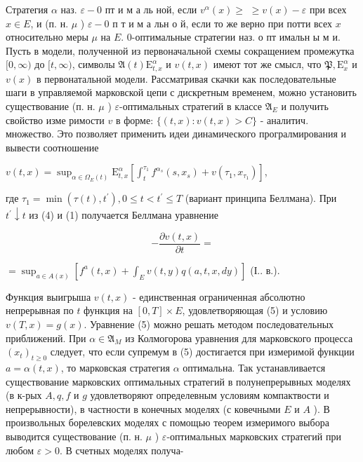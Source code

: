 \documentclass[10pt]{article}
\begin{document}
Стратегия $\alpha$ наз. $\varepsilon-0$ пт и м а ль ной, если $v^{\alpha}(x) \geqslant$ $\geqslant v(x)-\varepsilon$ при всех $x \in E$, и (п. н. $\mu$ ) $\varepsilon-0$ п т и м а льн о й, если то же верно при потти всех $x$ относительно меры $\mu$ на $E$. 0-оптимальные стратегии наз. о пт имальн ы м и. Пусть в модели, полученной из первоначальной схемы сокращением промежутка $[0, \infty)$ до $[t, \infty)$, символы $\mathfrak{A}(t) \mathrm{E}_{t, x}^{\alpha}$ и $v(t, x)$ имеют тот же смысл, что $\mathfrak{P}, \mathrm{E}_{x}^{\alpha}$ и $v(x)$ в первонатальной модели. Рассматривая скачки как последовательные шаги в управляемой марковской цепи с дискретным временем, можно установить существование (п. н. $\mu$ ) $\varepsilon$-оптимальных стратегий в классе $\mathfrak{A}_{E}$ и получить свойство изме римости $v$ в форме: $\{(t, x): v(t, x)>C\}$ - аналитич. множество. Это позволяет применить идеи динамического програлмирования и вывести соотношение



$v(t, x)=\sup _{\alpha \in \Omega_{E}(t)} \mathrm{E}_{t, x}^{\alpha}\left[\int_{t}^{\tau_{1}} f^{\alpha_{s}}\left(s, x_{s}\right)+v\left(\tau_{1}, x_{\tau_{1}}\right)\right]$,



где $\tau_{1}=\min \left(\tau(t), t^{\prime}\right), 0 \leqslant t<t^{\prime} \leqslant T$ (вариант принципа Беллмана). При $t^{\prime} \downarrow t$ из (4) и (1) получается Беллмана уравнение



\[

-\frac{\partial v(t, x)}{\partial t}=

\]



$=\sup _{a \in A(x)}\left[f^{a}(t, x)+\int_{E} v(t, y) q(a, t, x, d y)\right]$ (І.. в.).



Функция выигрыша $v(t, x)$ - единственная ограниченная абсолютно непрерывная по $t$ функция на $[0, T] \times E$, удовлетворяющая (5) и условию $v(T, x)=g(x)$. Уравнение (5) можно решать методом последовательных приближений. При $\alpha \in \mathfrak{A}_{M}$ из Колмогорова уравнения для марковского процесса $\left(x_{t}\right)_{t \geqslant 0}$ следует, что если супремум в (5) достигается при измеримой функции $a=\alpha(t, x)$, то марковская стратегия $\alpha$ оптимальна. Так устанавливается существование марковских оптимальных стратегий в полунепрерывных моделях (в к-рых $A, q, f$ и $g$ удовлетворяют определевным условиям компактвости и непрерывности), в частности в конечных моделях (с ковечными $E$ и $A$ ). В произвольных борелевских моделях с помощью теорем измеримого выбора выводится существование (п. н. $\mu$ ) $\varepsilon$-оптимальных марковских стратегий при любом $\varepsilon>0$. В счетных моделях получа-
\end{document}

